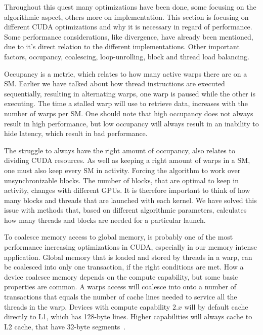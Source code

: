 Throughout this quest many optimizations have been done, some focusing on the algorithmic aspect, others more on implementation. This section is focusing on different CUDA optimizations and why it is necessary in regard of performance. Some performance considerations, like divergence, have already been mentioned, due to it's direct relation to the different implementations. Other important factors, occupancy, coalescing, loop-unrolling, block and thread load balancing.

Occupancy is a metric, which relates to how many active warps there are on a SM. Earlier we have talked about how thread instructions are executed sequentially, resulting in alternating warps, one warp is paused while the other is executing. The time a stalled warp will use to retrieve data, increases with the number of warps per SM. One should note that high occupancy does not always result in high performance, but low occupancy will always result in an inability to hide latency, which result in bad performance.

The struggle to always have the right amount of occupancy, also relates to dividing CUDA resources. As well as keeping a right amount of warps in a SM, one must also keep every SM in activity. Forcing the algorithm to work over unsynchronizable blocks. The number of blocks, that are optimal to keep in activity, changes with different GPUs. It is therefore important to think of how many blocks and threads that are launched with each kernel. We have solved this issue with methods that, based on different algorithmic parameters, calculates how many threads and blocks are needed for a particular launch.

To coalesce memory access to global memory, is probably one of the most performance increasing optimizations in CUDA, especially in our memory intense application. Global memory that is loaded and stored by threads in a warp, can be coalesced into only one transaction, if the right conditions are met. How a device coalesce memory depends on the compute capability, but some basic properties are common. A warps access will coalesce into onto a number of transactions that equals the number of cache lines needed to service all the threads in the warp. Devices with compute capability $2.x$ will by default cache directly to L1, which has 128-byte lines. Higher capabilities will always cache to L2 cache, that have 32-byte segments~\cite{cuda_c_best_practices_guide}. 

